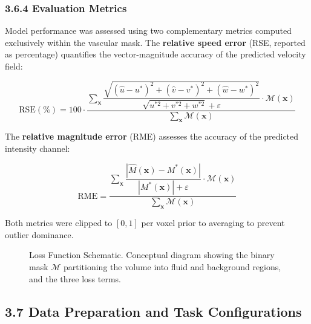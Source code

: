 \subsubsection*{3.6.4 Evaluation Metrics}

Model performance was assessed using two complementary metrics computed exclusively within the vascular mask. The \textbf{relative speed error} (RSE, reported as percentage) quantifies the vector-magnitude accuracy of the predicted velocity field:

\begin{equation}
    \text{RSE}(\%) = 100 \cdot \frac{
        \sum_{\mathbf{x}} \dfrac{\sqrt{(\hat{u}-u^*)^2+(\hat{v}-v^*)^2+(\hat{w}-w^*)^2}}{\sqrt{u^{*2}+v^{*2}+w^{*2}}+\varepsilon} \cdot \mathcal{M}(\mathbf{x})
    }{
        \sum_{\mathbf{x}} \mathcal{M}(\mathbf{x})
    }
\end{equation}

The \textbf{relative magnitude error} (RME) assesses the accuracy of the predicted intensity channel:

\begin{equation}
    \text{RME} = \frac{
        \sum_{\mathbf{x}} \dfrac{|\hat{M}(\mathbf{x}) - M^*(\mathbf{x})|}{|M^*(\mathbf{x})| + \varepsilon} \cdot \mathcal{M}(\mathbf{x})
    }{
        \sum_{\mathbf{x}} \mathcal{M}(\mathbf{x})
    }
\end{equation}

Both metrics were clipped to $[0, 1]$ per voxel prior to averaging to prevent outlier dominance.

\begin{figure}[h]
    \centering
    \caption{Loss Function Schematic. Conceptual diagram showing the binary mask $\mathcal{M}$ partitioning the volume into fluid and background regions, and the three loss terms.}
    \label{fig:loss}
\end{figure}

\subsection*{3.7 Data Preparation and Task Configurations}

